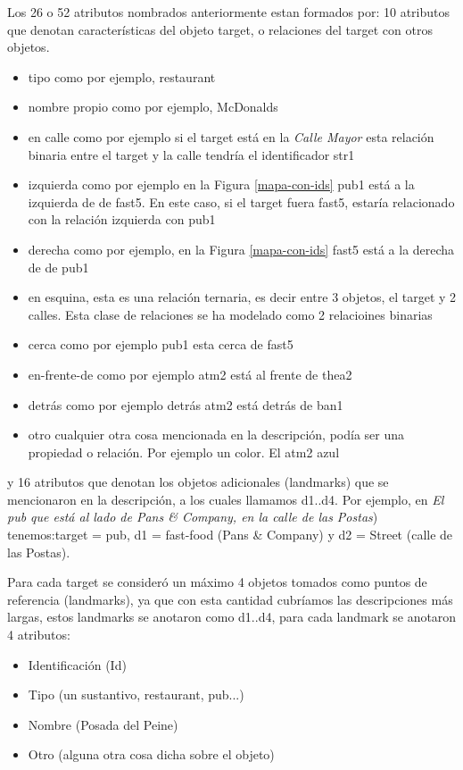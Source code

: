 Los 26 o 52 atributos nombrados anteriormente estan formados por:
10 atributos que denotan caracter\'isticas del objeto target, o relaciones del target con otros objetos.
\begin{itemize}
  \item tipo como por ejemplo, restaurant
  \item nombre propio como por ejemplo, McDonalds
  \item en calle como por ejemplo si el target est\'a en la {\it Calle Mayor} esta relaci\'on binaria entre el target y la calle tendr\'ia el identificador str1
  \item izquierda como por ejemplo en la Figura \ref{mapa-con-ids} pub1 est\'a a la izquierda de de fast5. En este caso, si el target fuera fast5, estar\'ia relacionado con la relaci\'on izquierda con pub1
  \item derecha como por ejemplo, en la Figura \ref{mapa-con-ids} fast5 est\'a a la derecha de de pub1
  \item en esquina, esta es una relaci\'on ternaria, es decir entre 3 objetos, el target y 2 calles. Esta clase de relaciones se ha modelado como 2 relacioines binarias    
  \item cerca como por ejemplo pub1 esta cerca de fast5
  \item en-frente-de como por ejemplo atm2 est\'a al frente de thea2
  \item detr\'as como por ejemplo detr\'as atm2 est\'a detr\'as de ban1
  \item otro cualquier otra cosa mencionada en la descripci\'on, pod\'ia ser una propiedad o relaci\'on. Por ejemplo un color. El atm2 azul
\end{itemize}
y 16 atributos que denotan los objetos adicionales (landmarks) que se mencionaron en la descripci\'on, a los cuales llamamos d1..d4. Por ejemplo, en {\it El pub que est\'a al lado de Pans \& Company, en la calle de las Postas}) tenemos:target = pub, d1 = fast-food (Pans \& Company) y d2 = Street (calle de las Postas).

Para cada target se consider\'o un m\'aximo 4 objetos tomados como puntos de referencia (landmarks), ya que con esta cantidad cubr\'iamos las descripciones m\'as largas, estos landmarks se anotaron como d1..d4, para cada landmark se anotaron 4 atributos:
\begin{itemize}
  \item Identificaci\'on (Id)
  \item Tipo (un sustantivo, restaurant, pub...)
  \item Nombre (Posada del Peine)
  \item Otro (alguna otra cosa dicha sobre el objeto)
\end{itemize}

